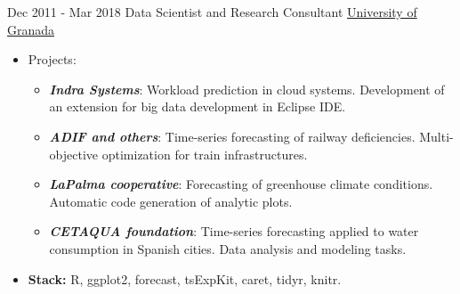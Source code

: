 \documentclass[letterpaper]{twentysecondcv} %
\begin{document}
\begin{twenty}
        
	  \twentyitem
    	{Dec 2011 -}
		{Mar 2018}
        {Data Scientist and Research Consultant}
        {\href{https://www.indracompany.com/en/}{University of Granada}}
        {
        \begin{itemize}
        	\item Projects:
        	\begin{itemize}
        		\item \textbf{\textit{Indra Systems}}: Workload prediction in cloud systems. Development 	of an extension for big data development in Eclipse IDE.
        		\item \textbf{\textit{ADIF and others}}: Time-series forecasting of railway deficiencies. Multi-objective optimization for train infrastructures.
        		\item \textbf{\textit{LaPalma cooperative}}: Forecasting of greenhouse climate conditions. Automatic code generation of analytic plots.
        		\item \textbf{\textit{CETAQUA foundation}}: Time-series forecasting applied to water consumption in Spanish cities. Data analysis and modeling tasks.
        	\end{itemize}
        	\item \textbf{Stack:} R, ggplot2, forecast, tsExpKit, caret, tidyr, knitr.
        

\end{itemize}}
\end{twenty}
\end{document}
